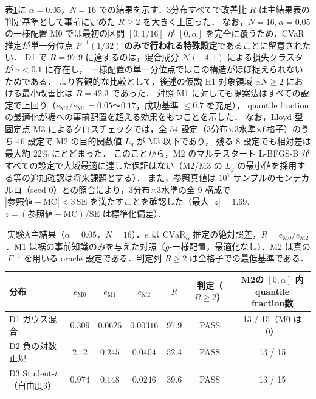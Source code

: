 \documentclass[a4paper,10pt]{jsarticle}
\theoremstyle{definition}
\newcommand{\CVaR}{\mathrm{CVaR}}
\newcommand{\Finv}{F^{-1}}
\begin{document}
表\ref{tab:A1}に $\alpha=0.05$，$N=16$ での結果を示す．3分布すべてで改善比 $R$ は主結果表の判定基準として事前に定めた $R\ge2$ を大きく上回った．
なお，$N=16, \alpha=0.05$ の一様配置 M0 では最初の区間 $[0, 1/16]$ が $[0, \alpha]$ を完全に覆うため，CVaR 推定が単一分位点 $\Finv(1/32)$ \textbf{のみで行われる特殊設定}であることに留意されたい．
D1 で $R=97.9$ に達するのは，混合成分 $\mathcal N(-4,1)$ による損失クラスタが $\tau<0.1$ に存在し，
一様配置の単一分位点ではこの構造がほぼ捉えられないためである．
より客観的な比較として，後述の仮説 H1 対象領域 $\alpha N\ge2$ における最小改善比は $R=42.3$ であった．
対照 M1 に対しても提案法はすべての設定で上回り（$e_{\mathrm{M2}}/e_{\mathrm{M1}}=0.05$〜$0.17$，成功基準 $\le0.7$ を充足），
quantile fractionの最適化が裾への事前配置を超える効果をもつことを示した．
なお，Lloyd 型固定点 M3 によるクロスチェックでは，全 54 設定（3分布$\times$3水準$\times$6格子）のうち 46 設定で M2 の目的関数値 $L_g$ が M3 以下であり，
残る 8 設定でも相対差は最大約 22\% にとどまった．
このことから，M2 のマルチスタート L-BFGS-B がすべての設定で大域最適に達した保証はない（M2/M3 の $L_g$ の最小値を採用する等の追加確認は将来課題とする）．
また，参照真値は $10^7$ サンプルのモンテカルロ（seed 0）との照合により，3分布$\times$3水準の全 9 構成で
$|\text{参照値}-\text{MC}|<3\,\mathrm{SE}$ を満たすことを確認した（最大 $|z|=1.69$. $z=(\text{参照値}-\text{MC})/\mathrm{SE}$ は標準化偏差）．

\begin{table}[htbp]
\centering
\caption{実験A主結果（$\alpha=0.05$，$N=16$）．$e$ は $\CVaR_\alpha$ 推定の絶対誤差，$R=e_{\mathrm{M0}}/e_{\mathrm{M2}}$．M1 は裾の事前知識のみを与えた対照（$g$-一様配置，最適化なし）．M2 は真の $\Finv$ を用いる oracle 設定である．判定列 $R\ge2$ は全格子での最低基準である．}
\label{tab:A1}
\small
\setlength{\tabcolsep}{4pt}
\begin{tabular}{lcccccc}
\toprule
分布 & $e_{\mathrm{M0}}$ & $e_{\mathrm{M1}}$ & $e_{\mathrm{M2}}$ & $R$ & 判定（$R\ge2$） & M2の $[0,\alpha]$ 内quantile fraction数\\
\midrule
D1 ガウス混合 & $0.309$ & $0.0626$ & $0.00316$ & 97.9 & PASS & 13 / 15（M0 は 0）\\
D2 負の対数正規 & $2.12$ & $0.245$ & $0.0404$ & 52.4 & PASS & 13 / 15\\
D3 Student-$t$（自由度3） & $0.974$ & $0.148$ & $0.0246$ & 39.6 & PASS & 13 / 15\\
\bottomrule
\end{tabular}
\end{table}
\end{document}
